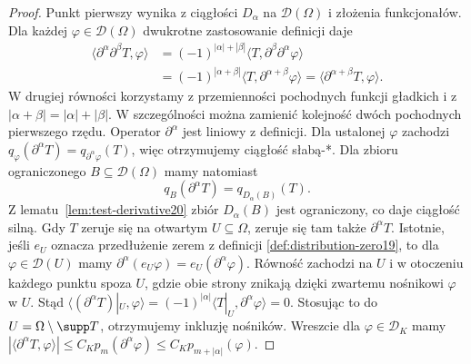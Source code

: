 \begin{proof}
Punkt pierwszy wynika z ciągłości $D_\alpha$ na
$\mathcal D(\Omega)$ i złożenia funkcjonałów.
Dla każdej $\varphi\in\mathcal D(\Omega)$ dwukrotne
zastosowanie definicji daje
\[
\begin{aligned}
\langle\partial^\alpha\partial^\beta T,\varphi\rangle
&=(-1)^{|\alpha|+|\beta|}
  \langle T,\partial^\beta\partial^\alpha\varphi\rangle\\
&=(-1)^{|\alpha+\beta|}
  \langle T,\partial^{\alpha+\beta}\varphi\rangle
 =\langle\partial^{\alpha+\beta}T,\varphi\rangle.
\end{aligned}
\]
W drugiej równości korzystamy z przemienności pochodnych
funkcji gładkich i z $|\alpha+\beta|=|\alpha|+|\beta|$.
W szczególności można zamienić kolejność dwóch pochodnych
pierwszego rzędu. Operator $\partial^\alpha$ jest liniowy
z definicji.
Dla ustalonej $\varphi$ zachodzi
$q_\varphi(\partial^\alpha T)=q_{\partial^\alpha\varphi}(T)$,
więc otrzymujemy ciągłość słabą-*.
Dla zbioru ograniczonego $B\subseteq\mathcal D(\Omega)$
mamy natomiast
\[
 q_B(\partial^\alpha T)=q_{D_\alpha(B)}(T).
\]
Z lematu~\ref{lem:test-derivative20} zbiór $D_\alpha(B)$ jest
ograniczony, co daje ciągłość silną. Gdy $T$ zeruje się na
otwartym $U\subseteq\Omega$, zeruje się tam także $\partial^\alpha T$.
Istotnie, jeśli $e_U$ oznacza przedłużenie zerem z definicji
\ref{def:distribution-zero19}, to dla $\varphi\in\mathcal D(U)$
mamy $\partial^\alpha(e_U\varphi)=e_U(\partial^\alpha\varphi)$.
Równość zachodzi na $U$ i w otoczeniu każdego punktu
spoza $U$, gdzie obie strony znikają dzięki zwartemu nośnikowi
$\varphi$ w $U$. Stąd
$\langle(\partial^\alpha T)|_U,\varphi\rangle
=(-1)^{|\alpha|}\langle T|_U,\partial^\alpha\varphi\rangle=0$.
Stosując to do $U=\Omega\setminus\supp T$, otrzymujemy
inkluzję nośników.
Wreszcie dla $\varphi\in\mathcal D_K$ mamy
$|\langle\partial^\alpha T,\varphi\rangle|
\le C_Kp_m(\partial^\alpha\varphi)
\le C_Kp_{m+|\alpha|}(\varphi)$.
\end{proof}

